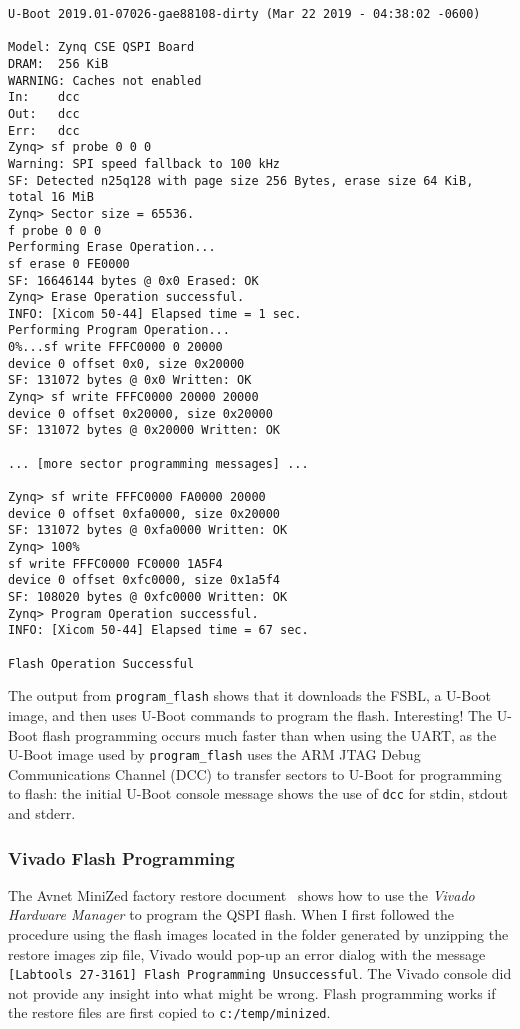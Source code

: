 \begin{verbatim}
U-Boot 2019.01-07026-gae88108-dirty (Mar 22 2019 - 04:38:02 -0600)

Model: Zynq CSE QSPI Board
DRAM:  256 KiB
WARNING: Caches not enabled
In:    dcc
Out:   dcc
Err:   dcc
Zynq> sf probe 0 0 0
Warning: SPI speed fallback to 100 kHz
SF: Detected n25q128 with page size 256 Bytes, erase size 64 KiB, total 16 MiB
Zynq> Sector size = 65536.
f probe 0 0 0
Performing Erase Operation...
sf erase 0 FE0000
SF: 16646144 bytes @ 0x0 Erased: OK
Zynq> Erase Operation successful.
INFO: [Xicom 50-44] Elapsed time = 1 sec.
Performing Program Operation...
0%...sf write FFFC0000 0 20000
device 0 offset 0x0, size 0x20000
SF: 131072 bytes @ 0x0 Written: OK
Zynq> sf write FFFC0000 20000 20000
device 0 offset 0x20000, size 0x20000
SF: 131072 bytes @ 0x20000 Written: OK

... [more sector programming messages] ...

Zynq> sf write FFFC0000 FA0000 20000
device 0 offset 0xfa0000, size 0x20000
SF: 131072 bytes @ 0xfa0000 Written: OK
Zynq> 100%
sf write FFFC0000 FC0000 1A5F4
device 0 offset 0xfc0000, size 0x1a5f4
SF: 108020 bytes @ 0xfc0000 Written: OK
Zynq> Program Operation successful.
INFO: [Xicom 50-44] Elapsed time = 67 sec.

Flash Operation Successful
\end{verbatim}
%
The output from \verb+program_flash+ shows that it downloads the FSBL,
a U-Boot image, and then uses U-Boot commands to program the flash.
Interesting! The U-Boot flash programming occurs much faster than
when using the UART, as the U-Boot image used by
\verb+program_flash+ uses the ARM JTAG Debug Communications Channel
(DCC) to transfer sectors to U-Boot for programming to flash:
the initial U-Boot console message shows the use of \verb+dcc+ for
stdin, stdout and stderr.

\subsubsection{Vivado Flash Programming}

The Avnet MiniZed factory restore document~\cite{Avnet_MiniZed_Restore_2018}
shows how to use the \emph{Vivado Hardware Manager} to program the QSPI flash.
When I first followed the procedure using the flash images located
in the folder generated by unzipping the restore images zip file,
Vivado would pop-up an error dialog with the message
\verb+[Labtools 27-3161] Flash Programming Unsuccessful+. The Vivado
console did not provide any insight into what might be wrong.
%
Flash programming works if the restore files are first copied to
\verb+c:/temp/minized+.

